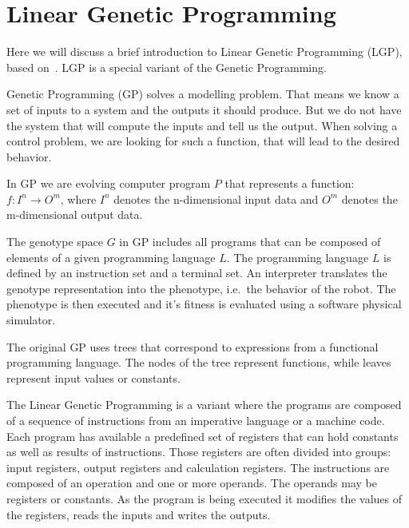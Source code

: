 \documentclass{ExcelAtFIT}
\begin{document}
\section{Linear Genetic Programming}
\label{sec:theory}
Here we will discuss a brief introduction to Linear Genetic Programming (LGP), based on~\cite{Brameier2010}.
LGP is a special variant of the Genetic Programming.

Genetic Programming (GP) solves a modelling problem.
That means we know a set of inputs to a system and the outputs it should produce.
But we do not have the system that will compute the inputs and tell us the output.
When solving a control problem, we are looking for such a function, that will lead to the desired behavior.

In GP we are evolving computer program $P$ that represents a function: $f : I^n \to O^m$, where $I^n$ denotes the n-dimensional input data and $O^m$ denotes the m-dimensional output data.

The genotype space $G$ in GP includes all programs that can be composed of elements of a given programming language $L$.
The programming language $L$ is defined by an instruction set and a terminal set.
An interpreter translates the genotype representation into the phenotype, i.e.\ the behavior of the robot.
The phenotype is then executed and it's fitness is evaluated using a software physical simulator.

The original GP uses trees that correspond to expressions from a functional programming language.
The nodes of the tree represent functions, while leaves represent input values or constants.

The Linear Genetic Programming is a variant where the programs are composed of a sequence of instructions from an imperative language or a machine code.
Each program has available a predefined set of registers that can hold constants as well as results of instructions.
Those registers are often divided into groups: input registers, output registers and calculation registers.
The instructions are composed of an operation and one or more operands.
The operands may be registers or constants.
As the program is being executed it modifies the values of the registers, reads the inputs and writes the outputs.
\end{document}
